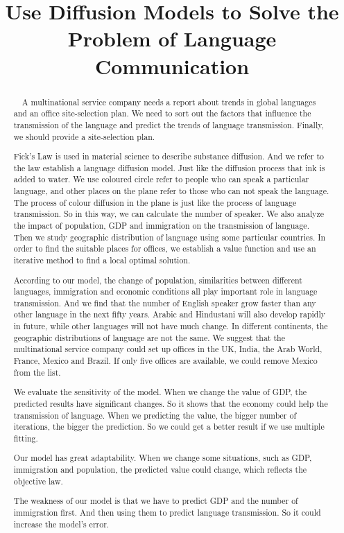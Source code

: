 \documentclass{mcmthesis}
\title{Use Diffusion Models to Solve the Problem of Language Communication}
\begin{document}
\setlength{2em}%

  \begin{abstract}

    \ \ A multinational service company needs a report about trends in global languages and an office site-selection plan.
    We need to sort out the factors that influence the transmission of the language and predict the trends of language transmission.
    Finally, we should provide a site-selection plan.

    Fick's Law is used in material science to describe substance diffusion.
    And we refer to the law establish a language diffusion model.
    Just like the diffusion process that ink is added to water.
    We use coloured circle refer to people who can speak a particular language, and other places on the plane refer to those who can not speak the language.
    The process of colour diffusion in the plane is just like the process of language transmission. So in this way,
    we can calculate the number of speaker.
    We also analyze the impact of population, GDP and immigration on the transmission of language.
    Then we study geographic distribution of language using some particular countries.
    In order to find the suitable places for offices,
    we establish a value function and use an iterative method to find a local optimal solution.

    According to our model, the change of population,
    similarities between different languages,
    immigration and economic conditions all play important role in language transmission.
    And we find that the number of English speaker grow faster than any other language in the next fifty years.
    Arabic and Hindustani will also develop rapidly in future,
    while other languages will not have much change.
    In different continents, the geographic distributions of language are not the same.
    We suggest that the multinational service company could set up offices in the UK, India, the Arab World, France, Mexico and Brazil.
    If only five offices are available, we could remove Mexico from the list.

    We evaluate the sensitivity of the model.
    When we change the value of GDP, the predicted results have significant changes.
    So it shows that the economy could help the transmission of language.
    When we predicting the value,
    the bigger number of iterations,
    the bigger the prediction.
    So we could get a better result if we use multiple fitting.

    Our model has great adaptability.
    When we change some situations,
    such as GDP, immigration and population,
    the predicted value could change,
    which reflects the objective law.

    The weakness of our model is that we have to predict GDP and the number of immigration first.
    And then using them to predict language transmission.
    So it could increase the model's error.

  \end{abstract}
\end{document}
